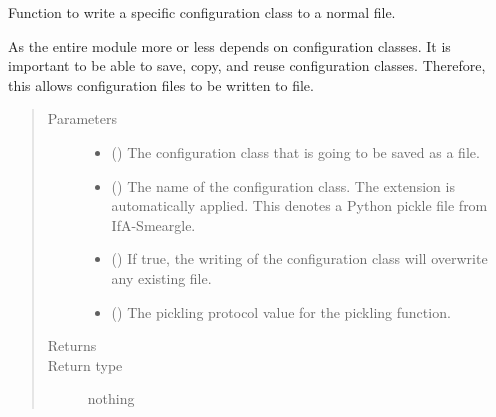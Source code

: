 \documentclass[letterpaper,10pt,english]{sphinxmanual}
\begin{document}
\begin{fulllineitems}
\label{\detokenize{python_docstrings/IfA_Smeargle.yankee.yankee_functions:IfA_Smeargle.yankee.yankee_functions.yankee_write_config_file}}
Function to write a specific configuration class to a normal file.

As the entire module more or less depends on configuration classes. It
is important to be able to save, copy, and reuse configuration classes.
Therefore, this allows configuration files to be written to file.
\begin{quote}\begin{description}
\item[{Parameters}] \leavevmode\begin{itemize}
\item {} 
 () \textendash{} The configuration class that is going to be saved as a file.

\item {} 
 () \textendash{} The name of the configuration class. The extension 
is automatically applied. This denotes a Python pickle file from
IfA-Smeargle.

\item {} 
 () \textendash{} If true, the writing of the configuration class will overwrite any
existing file.

\item {} 
 () \textendash{} The pickling protocol value for the pickling function.

\end{itemize}

\item[{Returns}] \leavevmode


\item[{Return type}] \leavevmode
nothing

\end{description}\end{quote}

\end{fulllineitems}
\end{document}
